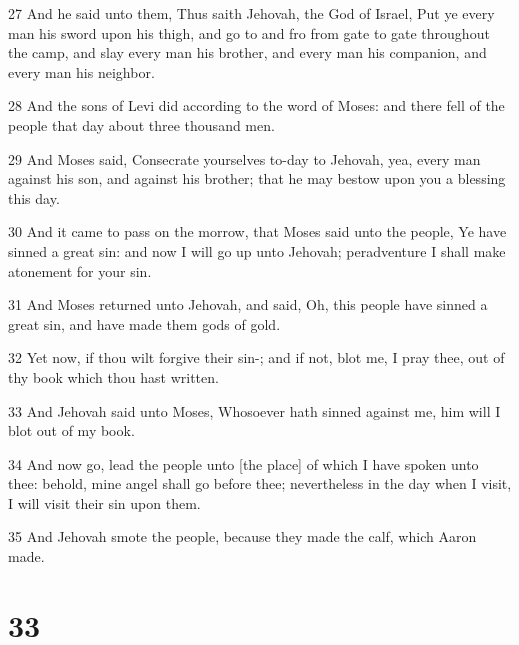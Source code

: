 \par 27 And he said unto them, Thus saith Jehovah, the God of Israel, Put ye every man his sword upon his thigh, and go to and fro from gate to gate throughout the camp, and slay every man his brother, and every man his companion, and every man his neighbor.
\par 28 And the sons of Levi did according to the word of Moses: and there fell of the people that day about three thousand men.
\par 29 And Moses said, Consecrate yourselves to-day to Jehovah, yea, every man against his son, and against his brother; that he may bestow upon you a blessing this day.
\par 30 And it came to pass on the morrow, that Moses said unto the people, Ye have sinned a great sin: and now I will go up unto Jehovah; peradventure I shall make atonement for your sin.
\par 31 And Moses returned unto Jehovah, and said, Oh, this people have sinned a great sin, and have made them gods of gold.
\par 32 Yet now, if thou wilt forgive their sin-; and if not, blot me, I pray thee, out of thy book which thou hast written.
\par 33 And Jehovah said unto Moses, Whosoever hath sinned against me, him will I blot out of my book.
\par 34 And now go, lead the people unto [the place] of which I have spoken unto thee: behold, mine angel shall go before thee; nevertheless in the day when I visit, I will visit their sin upon them.
\par 35 And Jehovah smote the people, because they made the calf, which Aaron made.

\chapter{33}

